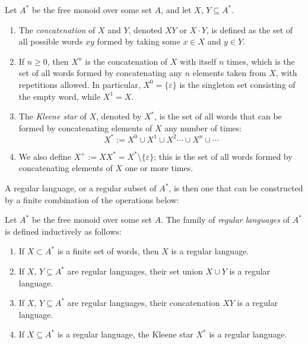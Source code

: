 \documentclass[../generics]{subfiles}
\begin{document}
\begin{definition}
Let $A^*$ be the free monoid over some set $A$, and let $X$, $Y \subseteq A^*$.
\begin{enumerate}
\item The \emph{concatenation} of $X$ and $Y$, denoted $XY$ or $X \cdot Y$, is defined as the set of all possible words $xy$ formed by taking some $x \in X$ and $y \in Y$.
\item If $n \geq 0$, then $X^n$ is the concatenation of $X$ with itself $n$ times, which is the set of all words formed by concatenating any $n$ elements taken from $X$, with repetitions allowed. In particular, $X^0=\{\varepsilon\}$ is the singleton set consisting of the empty word, while $X^1=X$.
\item The \emph{Kleene star} of $X$, denoted by $X^*$, is the set of all words that can be formed by concatenating elements of $X$ any number of times:
\[
X^* := X^0 \cup X^1 \cup X^2 \cdots \cup X^n \cup \cdots
\]
\item We also define $X^+ := XX^* = X^* \setminus \{\varepsilon\}$; this is the set of all words formed by concatenating elements of $X$ one or more times.
\end{enumerate}
\end{definition}

A regular language, or a regular subset of $A^*$, is then one that can be constructed by a finite combination of the operations below:

\begin{definition}
Let $A^*$ be the free monoid over some set $A$. The family of \emph{regular languages} of $A^*$ is defined inductively as follows:
\begin{enumerate}
\item If $X \subset A^*$ is a finite set of words, then $X$ is a regular language.
\item If $X$, $Y \subseteq A^*$ are regular languages, their set union $X \cup Y$ is a regular language.
\item If $X$, $Y \subseteq A^*$ are regular languages, their concatenation $XY$ is a regular language.
\item If $X \subseteq A^*$ is a regular language, the Kleene star $X^*$ is a regular language.
\end{enumerate}
\end{definition}
\end{document}
